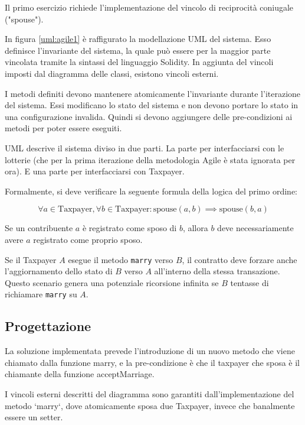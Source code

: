 \documentclass[conference]{IEEEtran}
\begin{document}
Il primo esercizio richiede l'implementazione del vincolo di reciprocità coniugale ("spouse").

In figura \ref{uml:agile1} è raffigurato la modellazione UML del sistema.
Esso definisce l'invariante del sistema, la quale può essere per la maggior parte vincolata tramite la sintassi del linguaggio Solidity.
In aggiunta del vincoli imposti dal diagramma delle classi, esistono vincoli esterni.

I metodi definiti devono mantenere atomicamente l'invariante durante l'iterazione del sistema. Essi modificano lo stato del sistema e
non devono portare lo stato in una configurazione invalida.
Quindi si devono aggiungere delle pre-condizioni ai metodi per poter essere eseguiti.

UML descrive il sistema diviso in due parti.
La parte per interfacciarsi con le lotterie (che per la prima iterazione della metodologia Agile è stata ignorata per ora).
E una parte per interfacciarsi con Taxpayer.



Formalmente, si deve verificare la seguente formula della logica del primo ordine:

\begin{equation}
	\label{V_spouse}
	\forall a \in \text{Taxpayer}, \forall b \in \text{Taxpayer}: \text{spouse}(a,b) \implies \text{spouse}(b,a)
\end{equation}

Se un contribuente $a$ è registrato come sposo di $b$, allora $b$ deve necessariamente avere $a$ registrato come proprio sposo.

Se il Taxpayer $A$ esegue il metodo \texttt{marry} verso $B$, il contratto deve forzare anche l'aggiornamento
dello stato di $B$ verso $A$ all'interno della stessa transazione. Questo scenario genera una potenziale ricorsione infinita
se $B$ tentasse di richiamare \texttt{marry} su $A$.

\subsection{Progettazione}

La soluzione implementata prevede l'introduzione di un nuovo metodo che viene chiamato dalla funzione marry,
e la pre-condizione è che il taxpayer che sposa è il chiamante della funzione acceptMarriage.

I vincoli esterni descritti del diagramma sono garantiti dall'implementazione del metodo `marry`, dove atomicamente
sposa due Taxpayer, invece che banalmente essere un setter.
\end{document}
